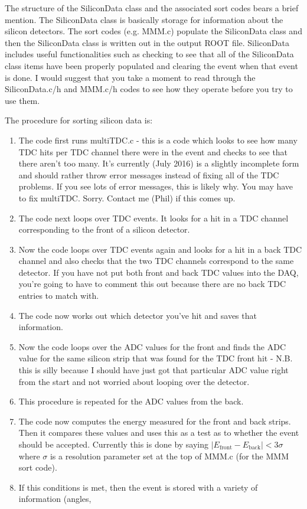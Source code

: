\documentclass[11pt]{report}
\begin{document}
The structure of the SiliconData class and the associated sort codes bears a brief mention. The SiliconData class is basically storage for information about the silicon detectors. The sort codes (e.g. MMM.c) populate the SiliconData class and then the SiliconData class is written out in the output ROOT file. SiliconData includes useful functionalities such as checking to see that all of the SiliconData class items have been properly populated and clearing the event when that event is done. I would suggest that you take a moment to read through the SiliconData.c/h and MMM.c/h codes to see how they operate before you try to use them.

The procedure for sorting silicon data is:

\begin{enumerate}
 \item The code first runs multiTDC.c - this is a code which looks to see how many TDC hits per TDC channel there were in the event and checks to see that there aren't too many. It's currently (July 2016) is a slightly incomplete form and should rather throw error messages instead of fixing all of the TDC problems. If you see lots of error messages, this is likely why. You may have to fix multiTDC. Sorry. Contact me (Phil) if this comes up.
 
 \item The code next loops over TDC events. It looks for a hit in a TDC channel corresponding to the front of a silicon detector.
 
 \item Now the code loops over TDC events again and looks for a hit in a back TDC channel and also checks that the two TDC channels correspond to the same detector. If you have not put both front and back TDC values into the DAQ, you're going to have to comment this out because there are no back TDC entries to match with.
 
 \item The code now works out which detector you've hit and saves that information.
 
 \item Now the code loops over the ADC values for the front and finds the ADC value for the same silicon strip that was found for the TDC front hit - N.B. this is silly because I should have just got that particular ADC value right from the start and not worried about looping over the detector.
 
 \item This procedure is repeated for the ADC values from the back.
 
 \item The code now computes the energy measured for the front and back strips. Then it compares these values and uses this as a test as to whether the event should be accepted. Currently this is done by saying $|E_{\mathrm{front}} - E_{\mathrm{back}}| < 3\sigma$ where $\sigma$ is a resolution parameter set at the top of MMM.c (for the MMM sort code).
 
 \item If this conditions is met, then the event is stored with a variety of information (angles, 
\end{enumerate}
\end{document}
